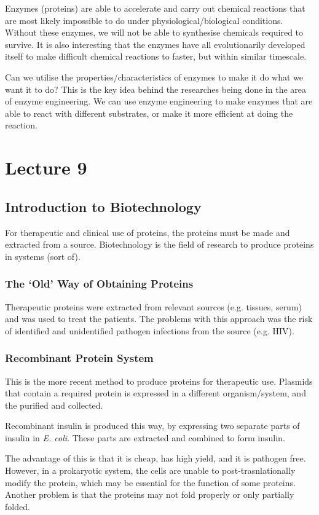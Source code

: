 \documentclass[a4paper, 12pt]{report}
\newcommand{\mychapter}[2]{
    \setcounter{chapter}{#1}
    \setcounter{section}{0}
    \chapter*{#2}
    \addcontentsline{toc}{chapter}{#2}
}
\begin{document}
Enzymes (proteins) are able to accelerate and carry out chemical reactions that are most likely impossible to do under physiological/biological conditions.
Without these enzymes, we will not be able to synthesise chemicals required to survive.
It is also interesting that the enzymes have all evolutionarily developed itself to make difficult chemical reactions to faster, but within similar timescale.

Can we utilise the properties/characteristics of enzymes to make it do what we want it to do?
This is the key idea behind the researches being done in the area of enzyme engineering.
We can use enzyme engineering to make enzymes that are able to react with different substrates, or make it more efficient at doing the reaction.

\mychapter{9}{Lecture 9}

\section{Introduction to Biotechnology}

For therapeutic and clinical use of proteins, the proteins must be made and extracted from a source.
Biotechnology is the field of research to produce proteins in systems (sort of).

\subsection{The `Old' Way of Obtaining Proteins}

Therapeutic proteins were extracted from relevant sources (e.g. tissues, serum) and was used to treat the patients.
The problems with this approach was the risk of identified and unidentified pathogen infections from the source (e.g. HIV).

\subsection{Recombinant Protein System}

This is the more recent method to produce proteins for therapeutic use.
Plasmids that contain a required protein is expressed in a different organism/system, and the purified and collected.

Recombinant insulin is produced this way, by expressing two separate parts of insulin in \textit{E. coli}.
These parts are extracted and combined to form insulin.

The advantage of this is that it is cheap, has high yield, and it is pathogen free.
However, in a prokaryotic system, the cells are unable to post-trasnlationally modify the protein, which may be essential for the function of some proteins.
Another problem is that the proteins may not fold properly or only partially folded.
\end{document}
